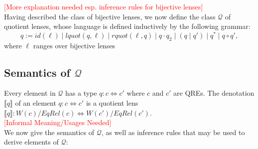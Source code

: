 \documentclass{svproc}
\newcommand{\sep}{\ensuremath{\; | \;}}
\begin{document}
\textcolor{red}{[More explanation needed esp. inference rules for bijective
lenses]}\\
Having described the class of bijective lenses, we now define the class
$\mathcal{Q}$ of quotient lenses, whose language is defined inductively by the
following grammar:
$$ q := id(\ell) \sep lquot(q, \ell) \sep rquot(\ell, q) \sep q
\cdot q_2 \sep (q \sep q') \sep q^* \sep q \circ q',$$
where $\ell$ ranges over bijective lenses 
\subsection{Semantics of $\mathcal{Q}$}
Every element in $\mathcal{Q}$ has a type $q :
c \Longleftrightarrow c'$ where $c$ and $c'$ are QREs. The denotation
$\llbracket q \rrbracket$ of an element $q : c \Longleftrightarrow c'$ is a
quotient lens $\llbracket q \rrbracket :
W(c)/{EqRel(c)} \Longleftrightarrow W(c')/{EqRel(c')}$.\\
\textcolor{red}{[Informal Meaning/Usages Needed]}\\We now give the
semantics of $\mathcal{Q}$, as well as inference rules that may be used to
derive elements of $\mathcal{Q}$:
\end{document}
